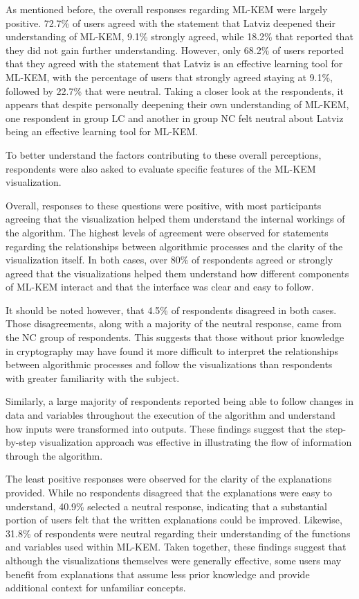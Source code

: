 \documentclass[runningheads]{llncs}
\begin{document}
As mentioned before, the overall responses regarding ML-KEM were largely positive. 72.7\% of users agreed with the statement that Latviz deepened their understanding of ML-KEM, 9.1\% strongly agreed, while 18.2\% that reported that they did not gain further understanding. However, only 68.2\% of users reported that they agreed with the statement that Latviz is an effective learning tool for ML-KEM, with the percentage of users that strongly agreed staying at 9.1\%, followed by 22.7\% that were neutral. Taking a closer look at the respondents, it appears that despite personally deepening their own understanding of ML-KEM, one respondent in group LC and another in group NC felt neutral about Latviz being an effective learning tool for ML-KEM.

To better understand the factors contributing to these overall perceptions, respondents were also asked to evaluate specific features of the ML-KEM visualization. 

Overall, responses to these questions were positive, with most participants agreeing that the visualization helped them understand the internal workings of the algorithm. The highest levels of agreement were observed for statements regarding the relationships between algorithmic processes and the clarity of the visualization itself. In both cases, over 80\% of respondents agreed or strongly agreed that the visualizations helped them understand how different components of ML-KEM interact and that the interface was clear and easy to follow. 

It should be noted however, that 4.5\% of respondents disagreed in both cases. Those disagreements, along with a majority of the neutral response, came from the NC group of respondents. This suggests that those without prior knowledge in cryptography may have found it more difficult to interpret the relationships between algorithmic processes and follow the visualizations than respondents with greater familiarity with the subject.

Similarly, a large majority of respondents reported being able to follow changes in data and variables throughout the execution of the algorithm and understand how inputs were transformed into outputs. These findings suggest that the step-by-step visualization approach was effective in illustrating the flow of information through the algorithm.

The least positive responses were observed for the clarity of the explanations provided. While no respondents disagreed that the explanations were easy to understand, 40.9\% selected a neutral response, indicating that a substantial portion of users felt that the written explanations could be improved. Likewise, 31.8\% of respondents were neutral regarding their understanding of the functions and variables used within ML-KEM. Taken together, these findings suggest that although the visualizations themselves were generally effective, some users may benefit from explanations that assume less prior knowledge and provide additional context for unfamiliar concepts.
\end{document}
